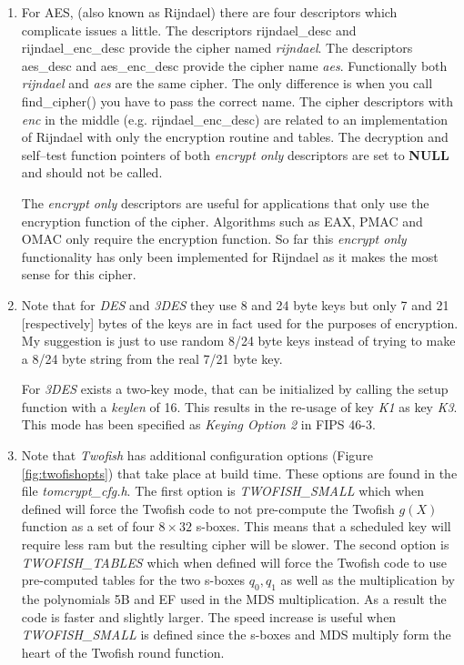 \documentclass[synpaper]{book}
\begin{document}
\begin{small}
\begin{enumerate}
\item
For AES, (also known as Rijndael) there are four descriptors which complicate issues a little.  The descriptors
rijndael\_desc and rijndael\_enc\_desc provide the cipher named \textit{rijndael}.  The descriptors aes\_desc and
aes\_enc\_desc provide the cipher name \textit{aes}.  Functionally both \textit{rijndael} and \textit{aes} are the same cipher.  The
only difference is when you call find\_cipher() you have to pass the correct name.  The cipher descriptors with \textit{enc}
in the middle (e.g. rijndael\_enc\_desc) are related to an implementation of Rijndael with only the encryption routine
and tables.  The decryption and self--test function pointers of both \textit{encrypt only} descriptors are set to \textbf{NULL} and
should not be called.

The \textit{encrypt only} descriptors are useful for applications that only use the encryption function of the cipher.  Algorithms such
as EAX, PMAC and OMAC only require the encryption function.  So far this \textit{encrypt only} functionality has only been implemented for
Rijndael as it makes the most sense for this cipher.

\item
Note that for \textit{DES} and \textit{3DES} they use 8 and 24 byte keys but only 7 and 21 [respectively] bytes of the keys are in
fact used for the purposes of encryption.  My suggestion is just to use random 8/24 byte keys instead of trying to make a 8/24
byte string from the real 7/21 byte key.

For \textit{3DES} exists a two-key mode, that can be initialized by calling the setup function with a \textit{keylen} of 16. This results in the re-usage of key \textit{K1} as key \textit{K3}. This mode has been specified as \textit{Keying Option 2} in FIPS 46-3.

\item
Note that \textit{Twofish} has additional configuration options (Figure \ref{fig:twofishopts}) that take place at build time.  These options are found in
the file \textit{tomcrypt\_cfg.h}.  The first option is \textit{TWOFISH\_SMALL} which when defined will force the Twofish code
to not pre-compute the Twofish \textit{$g(X)$} function as a set of four $8 \times 32$ s-boxes.  This means that a scheduled
key will require less ram but the resulting cipher will be slower.  The second option is \textit{TWOFISH\_TABLES} which when
defined will force the Twofish code to use pre-computed tables for the two s-boxes $q_0, q_1$ as well as the multiplication
by the polynomials 5B and EF used in the MDS multiplication.  As a result the code is faster and slightly larger.  The
speed increase is useful when \textit{TWOFISH\_SMALL} is defined since the s-boxes and MDS multiply form the heart of the
Twofish round function.


\end{enumerate}
\end{small}
\end{document}
